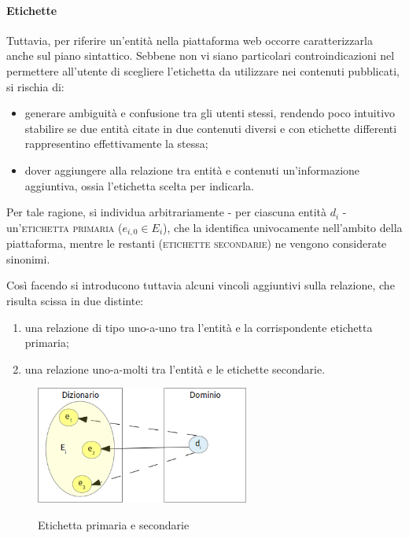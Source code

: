 \paragraph{Etichette}
Tuttavia, per riferire un'entità nella piattaforma web occorre caratterizzarla anche sul piano sintattico. Sebbene non vi siano particolari controindicazioni nel permettere all'utente di scegliere l'etichetta da utilizzare nei contenuti pubblicati, si rischia di:
\begin{itemize}
	\item generare ambiguità e confusione tra gli utenti stessi, rendendo poco intuitivo stabilire se due entità citate in due contenuti diversi e con etichette differenti rappresentino effettivamente la stessa;
	\item dover aggiungere alla relazione tra entità e contenuti un'informazione aggiuntiva, ossia l'etichetta scelta per indicarla.
\end{itemize}

Per tale ragione, si individua arbitrariamente - per ciascuna entità $d_i$ - un'\textsc{etichetta primaria} ($e_{i,0} \in E_i$), che la identifica univocamente nell'ambito della piattaforma, mentre le restanti (\textsc{etichette secondarie}) ne vengono considerate sinonimi.

Così facendo si introducono tuttavia alcuni vincoli aggiuntivi sulla relazione, che risulta scissa in due distinte:
\begin{enumerate}
	\item una relazione di tipo uno-a-uno tra l'entità e la corrispondente etichetta primaria;
	\item una relazione uno-a-molti tra l'entità e le etichette secondarie.
\end{enumerate}

\begin{figure}[ht]
	\begin{center}
		\includegraphics[width=7cm]{img/etichette-primarie-secondarie.png}
		\label{fig:tesi:stage:fase-uno:entita-sintassi-semantica}
		\caption{Etichetta primaria e secondarie}
	\end{center}
\end{figure}

